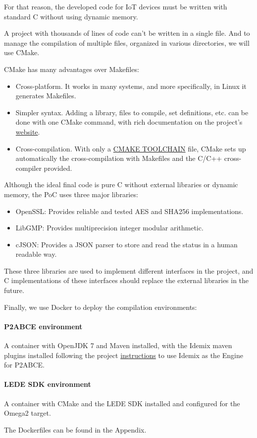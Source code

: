 For that reason, the developed code for IoT devices must be written with standard C without using dynamic memory.

\hfil

A project with thousands of lines of code can't be written in a single file. And to manage the compilation of multiple files, organized in various directories, we will use CMake.

CMake has many advantages over Makefiles:

\begin{itemize}
	\item Cross-platform. It works in many systems, and more specifically, in Linux it generates Makefiles.
	\item Simpler syntax. Adding a library, files to compile, set definitions, etc. can be done with one CMake command, with rich documentation on the project's \href{https://cmake.org/cmake/help/latest/}{website}.
	\item Cross-compilation. With only a \href{http://www.vtk.org/Wiki/CMake_Cross_Compiling#The_toolchain_file}{\small{CMAKE TOOLCHAIN}} file, CMake sets up automatically the cross-compilation with Makefiles and the C/C++ cross-compiler provided.
\end{itemize}


\hfil

Although the ideal final code is pure C without external libraries or dynamic memory, the \ac{PoC} uses three major libraries:

\begin{itemize}
	\item OpenSSL: Provides reliable and tested AES and SHA256 implementations.
	\item LibGMP: Provides multiprecision integer modular arithmetic.
	\item cJSON: Provides a JSON parser to store and read the status in a human readable way.
\end{itemize}

These three libraries are used to implement different interfaces in the project, and C implementations of these interfaces should replace the external libraries in the future.

\hfil

Finally, we use Docker to deploy the compilation environments:

\paragraph{P2ABCE environment} A container with OpenJDK 7 and Maven installed, with the Idemix maven plugins installed following the project \href{https://github.com/p2abcengine/p2abcengine/wiki/How-to-Build-the-ABC-Engine}{instructions} to use Idemix as the Engine for P2ABCE.

\paragraph{LEDE SDK environment} A container with CMake and the LEDE SDK \citep{ledeproject} installed and configured for the Omega2 target.

The Dockerfiles can be found in the Appendix.
